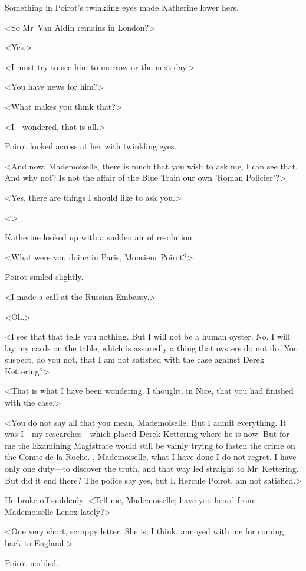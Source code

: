 Something in Poirot's twinkling eyes made Katherine lower hers.

<So Mr~Van Aldin remains in London?>

<Yes.>

<I must try to see him to-morrow or the next day.>

<You have news for him?>

<What makes you think that?>

<I—wondered, that is all.>

Poirot looked across at her with twinkling eyes.

<And now, Mademoiselle, there is much that you wish to ask me, I can see that. And why not? Is not the affair of the Blue Train our own 'Roman Policier'?>

<Yes, there are things I should like to ask you.>

<>

Katherine looked up with a sudden air of resolution.

<What were you doing in Paris, Monsieur Poirot?>

Poirot smiled slightly.

<I made a call at the Russian Embassy.>

<Oh.>

<I see that that tells you nothing. But I will not be a human oyster. No, I will lay my cards on the table, which is assuredly a thing that oysters do not do. You suspect, do you not, that I am not satisfied with the case against Derek Kettering?>

<That is what I have been wondering. I thought, in Nice, that you had finished with the case.>

<You do not say all that you mean, Mademoiselle. But I admit everything. It was I—my researches—which placed Derek Kettering where he is now. But for me the Examining Magistrate would still be vainly trying to fasten the crime on the Comte de la Roche. , Mademoiselle, what I have done I do not regret. I have only one duty—to discover the truth, and that way led straight to Mr~Kettering. But did it end there? The police say yes, but I, Hercule Poirot, am not satisfied.>

He broke off suddenly. <Tell me, Mademoiselle, have you heard from Mademoiselle Lenox lately?>

<One very short, scrappy letter. She is, I think, annoyed with me for coming back to England.>

Poirot nodded.

